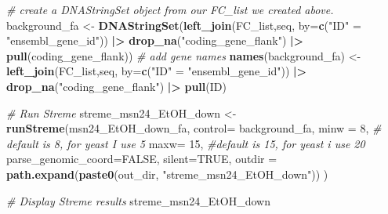 \documentclass[
]{book}
\newenvironment{Shaded}{\begin{snugshade}}{\end{snugshade}}
\newcommand{\AttributeTok}[1]{\textcolor[rgb]{0.13,0.29,0.53}{#1}}
\newcommand{\CommentTok}[1]{\textcolor[rgb]{0.56,0.35,0.01}{\textit{#1}}}
\newcommand{\ConstantTok}[1]{\textcolor[rgb]{0.56,0.35,0.01}{#1}}
\newcommand{\DecValTok}[1]{\textcolor[rgb]{0.00,0.00,0.81}{#1}}
\newcommand{\FunctionTok}[1]{\textcolor[rgb]{0.13,0.29,0.53}{\textbf{#1}}}
\newcommand{\NormalTok}[1]{#1}
\newcommand{\OtherTok}[1]{\textcolor[rgb]{0.56,0.35,0.01}{#1}}
\newcommand{\SpecialCharTok}[1]{\textcolor[rgb]{0.81,0.36,0.00}{\textbf{#1}}}
\newcommand{\StringTok}[1]{\textcolor[rgb]{0.31,0.60,0.02}{#1}}
\begin{document}
\begin{Shaded}
\begin{Highlighting}[]
\CommentTok{\# create a DNAStringSet object from our FC\_list we created above.}
\NormalTok{background\_fa }\OtherTok{\textless{}{-}} \FunctionTok{DNAStringSet}\NormalTok{(}\FunctionTok{left\_join}\NormalTok{(FC\_list,seq, }\AttributeTok{by=}\FunctionTok{c}\NormalTok{(}\StringTok{"ID"} \OtherTok{=} \StringTok{"ensembl\_gene\_id"}\NormalTok{)) }\SpecialCharTok{|\textgreater{}}
                                       \FunctionTok{drop\_na}\NormalTok{(}\StringTok{"coding\_gene\_flank"}\NormalTok{) }\SpecialCharTok{|\textgreater{}} \FunctionTok{pull}\NormalTok{(coding\_gene\_flank))}
\CommentTok{\# add gene names}
\FunctionTok{names}\NormalTok{(background\_fa) }\OtherTok{\textless{}{-}} \FunctionTok{left\_join}\NormalTok{(FC\_list,seq, }\AttributeTok{by=}\FunctionTok{c}\NormalTok{(}\StringTok{"ID"} \OtherTok{=} \StringTok{"ensembl\_gene\_id"}\NormalTok{)) }\SpecialCharTok{|\textgreater{}}
                                       \FunctionTok{drop\_na}\NormalTok{(}\StringTok{"coding\_gene\_flank"}\NormalTok{) }\SpecialCharTok{|\textgreater{}} \FunctionTok{pull}\NormalTok{(ID)}
\end{Highlighting}
\end{Shaded}

\begin{Shaded}
\begin{Highlighting}[]
\CommentTok{\# Run Streme}
\NormalTok{streme\_msn24\_EtOH\_down }\OtherTok{\textless{}{-}} \FunctionTok{runStreme}\NormalTok{(msn24\_EtOH\_down\_fa, }
        \AttributeTok{control=}\NormalTok{ background\_fa,}
        \AttributeTok{minw =} \DecValTok{8}\NormalTok{, }\CommentTok{\# default is 8, for yeast I use 5}
        \AttributeTok{maxw=} \DecValTok{15}\NormalTok{, }\CommentTok{\#default is 15, for yeast i use 20}
        \AttributeTok{parse\_genomic\_coord=}\ConstantTok{FALSE}\NormalTok{,}
        \AttributeTok{silent=}\ConstantTok{TRUE}\NormalTok{,}
        \AttributeTok{outdir =} \FunctionTok{path.expand}\NormalTok{(}\FunctionTok{paste0}\NormalTok{(out\_dir, }\StringTok{"streme\_msn24\_EtOH\_down"}\NormalTok{))}
\NormalTok{        )}

\CommentTok{\# Display Streme results}
\NormalTok{streme\_msn24\_EtOH\_down}
\end{Highlighting}
\end{Shaded}
\end{document}
